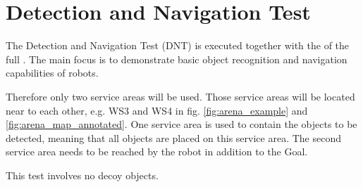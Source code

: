 

\section{Detection and Navigation Test}
\label{sec:Basic Manipulation Test}

The Detection and Navigation Test (DNT) is executed together with the  of the full
\RCAW. The main focus is to demonstrate basic object recognition and navigation capabilities of robots.

Therefore only two service areas will be used. Those service areas will be located near to each other, e.g. WS3 and WS4
in fig. \ref{fig:arena_example} and \ref{fig:arena_map_annotated}. One service area is used to contain the objects to be
detected, meaning that all objects are placed on this service area. The second service area needs to be reached by the
robot in addition to the Goal.

This test involves no decoy objects.
